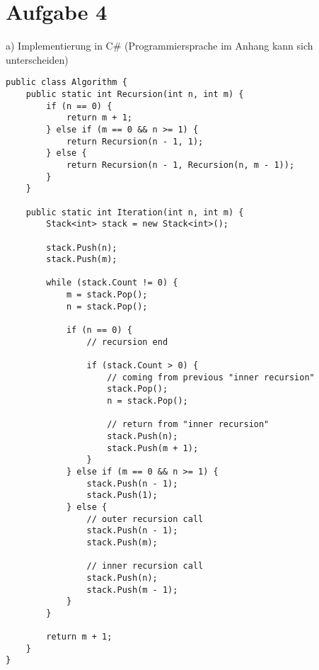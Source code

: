 \newpage

\section*{Aufgabe 4}
	a) Implementierung in C\# (Programmiersprache im Anhang kann sich unterscheiden)
	\begin{verbatim}
public class Algorithm {
    public static int Recursion(int n, int m) {
        if (n == 0) {
            return m + 1;
        } else if (m == 0 && n >= 1) {
            return Recursion(n - 1, 1);
        } else {
            return Recursion(n - 1, Recursion(n, m - 1));
        }
    }

    public static int Iteration(int n, int m) {
        Stack<int> stack = new Stack<int>();
        
        stack.Push(n);
        stack.Push(m);

        while (stack.Count != 0) {
            m = stack.Pop();
            n = stack.Pop();

            if (n == 0) {
                // recursion end

                if (stack.Count > 0) {
                    // coming from previous "inner recursion"
                    stack.Pop();
                    n = stack.Pop();

                    // return from "inner recursion"
                    stack.Push(n);
                    stack.Push(m + 1);
                }
            } else if (m == 0 && n >= 1) {
                stack.Push(n - 1);
                stack.Push(1);
            } else {
                // outer recursion call
                stack.Push(n - 1);
                stack.Push(m);

                // inner recursion call
                stack.Push(n);
                stack.Push(m - 1);
            }
        }

        return m + 1;
    }
}
	\end{verbatim}
	\newpage
    
